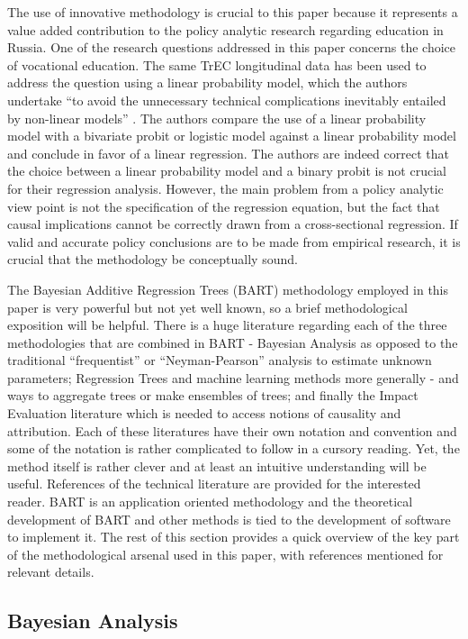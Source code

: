\documentclass[alpha-refs,fleqn]{wiley-article_p2}
\begin{document}
The use of innovative methodology is crucial to this paper because it represents a value added contribution to the policy analytic research regarding education in Russia. One of the research questions addressed in this paper concerns the choice of vocational education. The same TrEC longitudinal data has been used to address the question using a linear probability model, which the authors undertake ``to avoid the unnecessary technical complications inevitably entailed by non-linear models'' \cite{Bessudnov_2015}. The authors compare the use of a linear probability model with a bivariate probit or logistic model against a linear probability model and conclude in favor of a linear regression. The authors are indeed correct that the choice between a linear probability model and a binary probit is not crucial for their regression analysis. However, the main problem from a policy analytic view point is not the specification of the regression equation, but the fact that causal implications cannot be correctly drawn from a cross-sectional regression. If valid and accurate policy conclusions are to be made from empirical research, it is crucial that the methodology be conceptually sound.  

The Bayesian Additive Regression Trees (BART)  methodology employed in this paper is very powerful but not yet well known, so a brief methodological exposition will be helpful. There is a huge literature regarding each of the three methodologies that are combined in BART - Bayesian Analysis as opposed to the traditional ``frequentist'' or ``Neyman-Pearson'' analysis to estimate unknown parameters; Regression Trees and machine learning methods more generally - and ways to aggregate trees or make ensembles of trees; and finally the Impact Evaluation literature which is needed to access notions of causality and attribution. Each of these literatures have their own notation and convention and some of the notation is rather complicated to follow in a cursory reading. Yet, the method itself is rather clever and at least an intuitive understanding will be useful. References of the technical literature are provided for the interested reader. BART is an application oriented methodology and the theoretical development of BART and other methods is tied to the development of software to implement it. The rest of this section provides a quick overview of the key part of the methodological arsenal used in this paper, with references mentioned for relevant details. 

\subsection{Bayesian Analysis}
\end{document}
